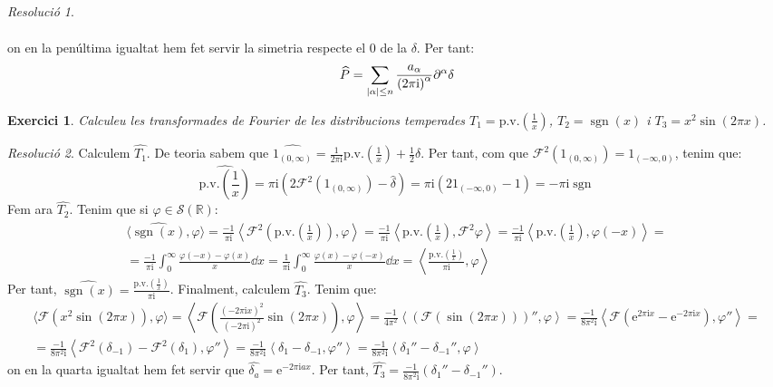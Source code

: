 \documentclass[10pt,a4paper]{article}
\newcommand{\RR}{\ensuremath{\mathbb{R}}} %
\newcommand{\vf}[1]{\boldsymbol{\mathrm{#1}}} %
\newcommand{\ii}{\mathrm{i}} %
\newtheorem{exercici}{Exercici}
\theoremstyle{definition}
\theoremstyle{remark}
\newtheorem*{res}{Resolució}
\newcommand{\F}{\mathcal{F}} %
\renewcommand{\pv}{\mathrm{p.v.}} %
\renewcommand{\exp}[1]{\mathrm{e}^{#1}} %
\DeclareMathOperator*{\sgn}{sgn}
\begin{document}
\begin{res}
\begin{enumerate}
\begin{multline*}
          \end{multline*}
          on en la penúltima igualtat hem fet servir la simetria respecte el 0 de la $\delta$. Per tant: $$\widehat{P}=\sum_{\abs{\alpha}\leq n}\frac{a_\alpha}{{(2\pi\ii)}^\alpha} {\partial^\alpha\delta}$$
  \end{enumerate}
\end{res}
\begin{exercici}
  Calculeu les transformades de Fourier de les distribucions temperades $T_1=\pv\left(\frac{1}{x}\right)$, $T_2=\sgn(x)$ i $T_3=x^2\sin(2\pi x)$.
\end{exercici}
\begin{res}
  Calculem $\widehat{T_1}$. De teoria sabem que $\widehat{\vf{1}_{(0,\infty)}}=\frac{1}{2\pi\ii} \pv\left(\frac{1}{x}\right)+\frac{1}{2}\delta$. Per tant, com que $\F^2(\vf{1}_{(0,\infty)})=\vf{1}_{(-\infty,0)}$, tenim que:
  $$
    \widehat{\pv\left(\frac{1}{x}\right)}=\pi\ii (2\F^2(\vf{1}_{(0,\infty)})-\widehat\delta)=\pi\ii (2\vf{1}_{(-\infty,0)}-1)=-\pi\ii\sgn
  $$
  Fem ara $\widehat{T_2}$. Tenim que si $\varphi\in \mathcal{S}(\RR)$:
  \begin{multline*}
    \langle\widehat{\sgn(x)},\varphi\rangle=\frac{-1}{\pi\ii}\left\langle\F^2\left(\pv\left(\frac{1}{x}\right)\right),\varphi\right\rangle=\frac{-1}{\pi\ii}\left\langle\pv\left(\frac{1}{x}\right),\F^2\varphi\right\rangle=\frac{-1}{\pi\ii}\left\langle\pv\left(\frac{1}{x}\right),\varphi(-x)\right\rangle=\\=\frac{-1}{\pi\ii}\int_0^\infty \frac{\varphi(-x)-\varphi(x)}{x}\dd{x}=\frac{1}{\pi\ii}\int_0^\infty \frac{\varphi(x)-\varphi(-x)}{x}\dd{x}=\left\langle \frac{\pv\left(\frac{1}{x}\right)}{\pi\ii},\varphi\right\rangle
  \end{multline*}
  Per tant, $\widehat{\sgn(x)}=\frac{\pv\left(\frac{1}{x}\right)}{\pi\ii}$. Finalment, calculem $\widehat{T_3}$. Tenim que:
  \begin{multline*}
    \langle \F(x^2\sin(2\pi x)),\varphi\rangle=\left\langle \F\left(\frac{{(-2\pi\ii x)}^2}{{(-2\pi\ii)}^2}\sin(2\pi x)\right),\varphi\right\rangle=\frac{-1}{4\pi^2}\left\langle {(\F(\sin(2\pi x)))}'',\varphi\right\rangle =\frac{-1}{8\pi^2\ii}\left\langle \F(\exp{2\pi\ii x}-\exp{-2\pi\ii x}),\varphi''\right\rangle =\\
    =\frac{-1}{8\pi^2\ii}\left\langle \F^2(\delta_{-1})-\F^2(\delta_{1}),\varphi''\right\rangle =\frac{-1}{8\pi^2\ii}\left\langle \delta_{1}-\delta_{-1},\varphi''\right\rangle =\frac{-1}{8\pi^2\ii}\left\langle {\delta_{1}}''-{\delta_{-1}}'',\varphi\right\rangle
  \end{multline*}
  on en la quarta igualtat hem fet servir que $\widehat{\delta_a}=\exp{-2\pi\ii a x}$. Per tant, $\widehat{T_3}=\frac{-1}{8\pi^2\ii}\left({\delta_{1}}''-{\delta_{-1}}''\right)$.
\end{res}
\end{document}
